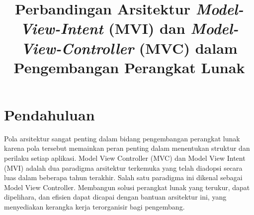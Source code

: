 \documentclass[conference]{IEEEtran}
\begin{document}
\title{Perbandingan Arsitektur \textit{Model-View-Intent} (MVI) dan  \textit{Model-View-Controller }(MVC) dalam Pengembangan Perangkat Lunak\\
}

\author{
\and
{}
\and
{}
\and
{}
\and
{}
}

\maketitle

\begin{abstract}
\end{abstract}

\begin{IEEEkeywords}

\end{IEEEkeywords}

\section{Pendahuluan}
Pola arsitektur sangat penting dalam bidang pengembangan perangkat lunak karena pola tersebut memainkan peran penting dalam menentukan struktur dan perilaku setiap aplikasi. Model View Controller (MVC) dan Model View Intent (MVI) adalah dua paradigma arsitektur terkemuka yang telah diadopsi secara luas dalam beberapa tahun terakhir. Salah satu paradigma ini dikenal sebagai Model View Controller. Membangun solusi perangkat lunak yang terukur, dapat dipelihara, dan efisien dapat dicapai dengan bantuan arsitektur ini, yang menyediakan kerangka kerja terorganisir bagi pengembang. 
\end{document}
